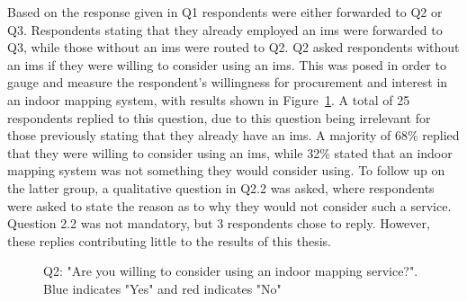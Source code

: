 Based on the response given in Q1 respondents were either forwarded to Q2 or Q3. Respondents stating that they already employed an \gls{ims} were forwarded to Q3, while those without an \gls{ims} were routed to Q2. Q2 asked respondents without an \gls{ims} if they were willing to consider using an \gls{ims}. This was posed in order to gauge and measure the respondent's willingness for procurement and interest in an indoor mapping system, with results shown in Figure~\ref{fig:q2}. A total of 25 respondents replied to this question, due to this question being irrelevant for those previously stating that they already have an \gls{ims}. A majority of 68\% replied that they were willing to consider using an \gls{ims}, while 32\% stated that an indoor mapping system was not something they would consider using. To follow up on the latter group, a qualitative question in Q2.2 was asked, where respondents were asked to state the reason as to why they would not consider such a service. Question 2.2 was not mandatory, but 3 respondents chose to reply. However, these replies contributing little to the results of this thesis.


\begin{figure}[H]
    \centering
    \caption{Q2: "Are you willing to consider using an indoor mapping service?". Blue indicates "Yes" and red indicates "No"}
    \label{fig:q2}
\end{figure}


